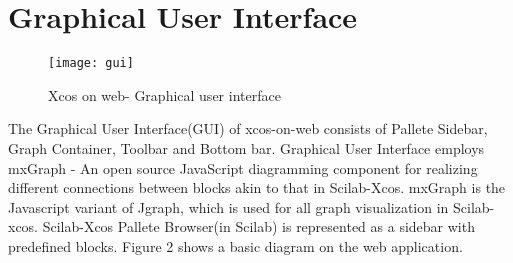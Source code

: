 \documentclass[conference]{IEEEtran}
\begin{document}
\section{Graphical User Interface}
\begin{figure}
    \centering
    \texttt{[image: gui]}
    \caption{Xcos on web- Graphical user interface}
    \label{fig:my_label}
\end{figure}
\iffalse
* --What mxgraph is \\                        
* --Mxrgaph Js equivalent of JGraphX \\
* 
* --Wires connection with mid-point snapping and multiple way-points was implemented on the web. \\
* --Created a custom delete function to delete all the edges related to a selected mxCell vertices. \\
* --Implemented connection constraints. (Rules) \\
* Rotate, mirror function \\
* Completed the 'link function' -- Each recently created link in the web application can now be styled depending on the source of each link and a 'name' attribute has been set to uniquely identify each type of link. \\
* edges - text label, label font family, label font size, label text color
* --Split-block is now displayed over it's immediate associated edges. \\
* --Tooltip \\
* --port constraints and rules\\
* --right side frame on editor\\
*zoom, print, redo, undo etx\\
*right click functionality(all)\\
*how the details were mapped with data structures\\
*colour wheel jquery code
*import export button fucntionality not working..that will be explained in server side\\
\fi

The Graphical User Interface(GUI) of xcos-on-web consists of Pallete Sidebar, Graph Container, Toolbar and Bottom bar. Graphical User Interface employs mxGraph - An open source JavaScript diagramming component for realizing different connections between blocks akin to that in Scilab-Xcos. mxGraph is the Javascript variant of Jgraph, which is used for all graph visualization in Scilab-xcos. Scilab-Xcos Pallete Browser(in Scilab) is represented as a sidebar with predefined blocks. Figure 2 shows a basic diagram on the web application.
\end{document}
